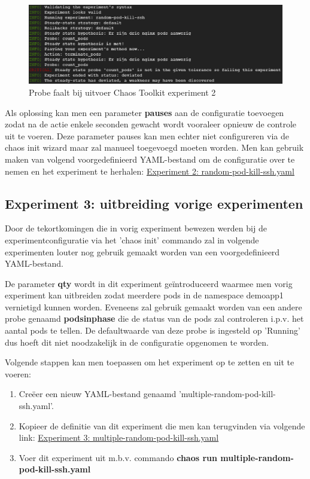 \begin{figure}[h]
    \centering
    \includegraphics[scale=.7]{img/chaostoolkit-ex2.png}
    \caption{Probe faalt bij uitvoer Chaos Toolkit experiment 2}
    \label{img:chaostoolkitex2}
\end{figure}

Als oplossing kan men een parameter {\bf pauses} aan de configuratie toevoegen zodat na de actie enkele seconden gewacht wordt vooraleer opnieuw de controle uit te voeren. Deze parameter pauses kan men echter niet configureren via de chaos init wizard maar zal manueel toegevoegd moeten worden.
Men kan gebruik maken van volgend voorgedefinieerd YAML-bestand om de configuratie over te nemen en het experiment te herhalen: \href{https://github.com/KenBruggeman/BP\textunderscore 21-22/blob/master/bachelorproef/docs/chaostoolkit%20experimenten/random-pod-kill-ssh.yaml}{Experiment 2: random-pod-kill-ssh.yaml}
    
\subsection{Experiment 3: uitbreiding vorige experimenten}

Door de tekortkomingen die in vorig experiment bewezen werden bij de experimentconfiguratie via het 'chaos init' commando zal in volgende experimenten louter nog gebruik gemaakt worden van een voorgedefinieerd YAML-bestand. 

De parameter {\bf qty} wordt in dit experiment geïntroduceerd waarmee men vorig experiment kan uitbreiden zodat meerdere pods in de namespace demoapp1 vernietigd kunnen worden. Eveneens zal gebruik gemaakt worden van een andere probe genaamd {\bf pods\textunderscore in\textunderscore phase} die de status van de pods zal controleren i.p.v. het aantal pods te tellen. De defaultwaarde van deze probe is ingesteld op 'Running' dus hoeft dit niet noodzakelijk in de configuratie opgenomen te worden. \autocite{ChaosToolkit2022c}

Volgende stappen kan men toepassen om het experiment op te zetten en uit te voeren:
\begin{enumerate}
    \item Creëer een nieuw YAML-bestand genaamd 'multiple-random-pod-kill-ssh.yaml'. 
    \item Kopieer de definitie van dit experiment die men kan terugvinden via volgende link: \href{https://github.com/KenBruggeman/BP\textunderscore 21-22/blob/master/bachelorproef/docs/chaostoolkit%20experimenten/multiple-random-pod-kill-ssh.yaml}{Experiment 3: multiple-random-pod-kill-ssh.yaml}
    \item Voer dit experiment uit m.b.v. commando {\bf chaos run multiple-random-pod-kill-ssh.yaml} 
\end{enumerate}


